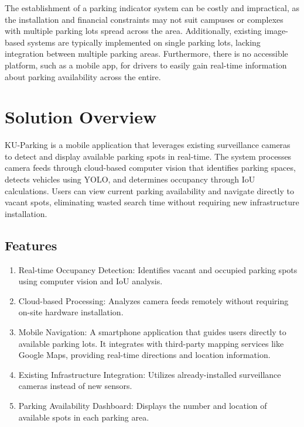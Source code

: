 The establishment of a parking indicator system can be costly and impractical, as the installation and financial constraints may not suit campuses or complexes with multiple parking lots spread across the area. Additionally, existing image-based systems are typically implemented on single parking lots, lacking integration between multiple parking areas. Furthermore, there is no accessible platform, such as a mobile app, for drivers to easily gain real-time information about parking availability across the entire.

\section{Solution Overview}
\label{section:solution-overview}

KU-Parking is a mobile application that leverages existing surveillance cameras to detect and display available parking spots in real-time.
The system processes camera feeds through cloud-based computer vision that identifies parking spaces, detects vehicles using YOLO, and determines occupancy through IoU calculations.
Users can view current parking availability and navigate directly to vacant spots, eliminating wasted search time without requiring new infrastructure installation.


\subsection{Features}
\label{subsection:features}

\begin{enumerate}[leftmargin=80pt]
    \item Real-time Occupancy Detection: Identifies vacant and occupied parking spots using computer vision and IoU analysis.
    \item Cloud-based Processing: Analyzes camera feeds remotely without requiring on-site hardware installation.
    \item Mobile Navigation: A smartphone application that guides users directly to available parking lots. It integrates with third-party mapping services like Google Maps, providing real-time directions and location information.
    \item Existing Infrastructure Integration: Utilizes already-installed surveillance cameras instead of new sensors.
    \item Parking Availability Dashboard: Displays the number and location of available spots in each parking area.
    \end{enumerate}


